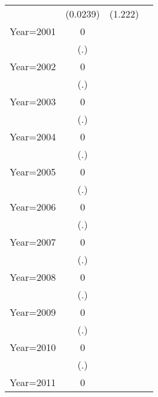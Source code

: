 \begin{table}[htbp]
\begin{tabular}{l*{3}{c}}
                & (0.0239)         &  (1.222)         &                  \\
\addlinespace
Year=2001       &        0         &                  &                  \\
                &      (.)         &                  &                  \\
\addlinespace
Year=2002       &        0         &                  &                  \\
                &      (.)         &                  &                  \\
\addlinespace
Year=2003       &        0         &                  &                  \\
                &      (.)         &                  &                  \\
\addlinespace
Year=2004       &        0         &                  &                  \\
                &      (.)         &                  &                  \\
\addlinespace
Year=2005       &        0         &                  &                  \\
                &      (.)         &                  &                  \\
\addlinespace
Year=2006       &        0         &                  &                  \\
                &      (.)         &                  &                  \\
\addlinespace
Year=2007       &        0         &                  &                  \\
                &      (.)         &                  &                  \\
\addlinespace
Year=2008       &        0         &                  &                  \\
                &      (.)         &                  &                  \\
\addlinespace
Year=2009       &        0         &                  &                  \\
                &      (.)         &                  &                  \\
\addlinespace
Year=2010       &        0         &                  &                  \\
                &      (.)         &                  &                  \\
\addlinespace
Year=2011       &        0         &                  &                  \\

\end{tabular}
\end{table}
